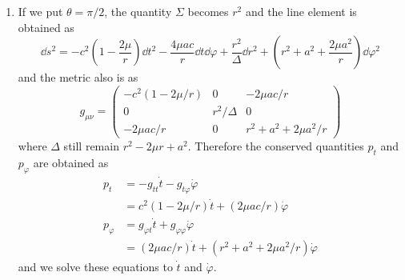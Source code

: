 \documentclass[a4paper,pdftex,10pt]{article}
\begin{document}
\maketitle

\begin{enumerate}
  \item
        If we put $\theta=\pi/2$, the quantity $\Sigma$ becomes $r^2$ and the line element is obtained as
        \begin{equation}
          \dd s^2
          =
          -
          c^2
          \left( 1-\frac{2\mu}{r} \right)\dd t^2
          -
          \frac{4\mu ac}{r}\dd t\dd \varphi
          +
          \frac{r^2}{\Delta}\dd r^2
          +
          \left(
          r^2+a^2+\frac{2\mu a^2}{r}
          \right)
          \dd\varphi^2
        \end{equation}
        and the metric also is as
        \begin{equation}
          g_{\mu\nu}
          =
          \begin{pmatrix}
            -c^2(1-2\mu/r) & 0          & -2\mu ac/r           \\
            0              & r^2/\Delta & 0                    \\
            -2\mu ac/r     & 0          & r^2 + a^2 +2\mu a^2/r
          \end{pmatrix}
        \end{equation}
        where $\Delta$ still remain $r^2-2\mu r+a^2$. Therefore the conserved quantities $p_{t}$ and $p_{\varphi}$ are obtained as 
        \begin{align}
          p_{t}
          &=
          -g_{tt}\dot{t}-g_{t\varphi}\dot{\varphi}
          \nonumber
          \\
          &=
          c^2(1-2\mu/r)\dot{t}
          +
          (2\mu ac/r)\dot{\varphi}
          \\
          p_{\varphi}
          &=
          g_{\varphi t}\dot{t}+g_{\varphi\varphi}\dot{\varphi}
          \nonumber
          \\
          &=
          (2\mu ac/r) \dot{t}
          +
          (r^2 + a^2 +2\mu a^2/r)\dot{\varphi}
        \end{align} 
        and we solve these equations to $\dot{t}$ and $\dot{\varphi}$.

        











\end{enumerate}
\end{document}
